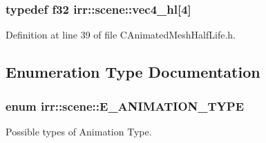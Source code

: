 \hypertarget{namespaceirr_1_1scene_aa60b31c24ff8ea9b12ded57166f93631}{
\subsubsection[{vec4\-\_\-hl}]{\setlength{\rightskip}{0pt plus 5cm}typedef f32 irr\-::scene\-::vec4\-\_\-hl\mbox{[}4\mbox{]}}}\label{namespaceirr_1_1scene_aa60b31c24ff8ea9b12ded57166f93631}


Definition at line 39 of file C\-Animated\-Mesh\-Half\-Life.\-h.



\subsection{Enumeration Type Documentation}
\hypertarget{namespaceirr_1_1scene_a401dc0823d375d3c1f3a64a8defee335}{
\subsubsection[{E\-\_\-\-A\-N\-I\-M\-A\-T\-I\-O\-N\-\_\-\-T\-Y\-P\-E}]{\setlength{\rightskip}{0pt plus 5cm}enum {\bf irr\-::scene\-::\-E\-\_\-\-A\-N\-I\-M\-A\-T\-I\-O\-N\-\_\-\-T\-Y\-P\-E}}}\label{namespaceirr_1_1scene_a401dc0823d375d3c1f3a64a8defee335}


Possible types of Animation Type. 

